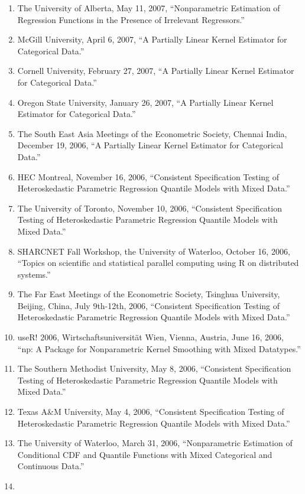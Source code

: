 \documentclass[
]{article}
\begin{document}
\begin{enumerate}
  Quantitative Data.''
\item
  The University of Alberta, May 11, 2007, ``Nonparametric Estimation of
  Regression Functions in the Presence of Irrelevant Regressors.''
\item
  McGill University, April 6, 2007, ``A Partially Linear Kernel
  Estimator for Categorical Data.''
\item
  Cornell University, February 27, 2007, ``A Partially Linear Kernel
  Estimator for Categorical Data.''
\item
  Oregon State University, January 26, 2007, ``A Partially Linear Kernel
  Estimator for Categorical Data.''
\item
  The South East Asia Meetings of the Econometric Society, Chennai
  India, December 19, 2006, ``A Partially Linear Kernel Estimator for
  Categorical Data.''
\item
  HEC Montreal, November 16, 2006, ``Consistent Specification Testing of
  Heteroskedastic Parametric Regression Quantile Models with Mixed
  Data.''
\item
  The University of Toronto, November 10, 2006, ``Consistent
  Specification Testing of Heteroskedastic Parametric Regression
  Quantile Models with Mixed Data.''
\item
  SHARCNET Fall Workshop, the University of Waterloo, October 16, 2006,
  ``Topics on scientific and statistical parallel computing using R on
  distributed systems.''
\item
  The Far East Meetings of the Econometric Society, Tsinghua University,
  Beijing, China, July 9th-12th, 2006, ``Consistent Specification
  Testing of Heteroskedastic Parametric Regression Quantile Models with
  Mixed Data.''
\item
  useR! 2006, Wirtschaftsuniversität Wien, Vienna, Austria, June 16,
  2006, ``np: A Package for Nonparametric Kernel Smoothing with Mixed
  Datatypes.''
\item
  The Southern Methodist University, May 8, 2006, ``Consistent
  Specification Testing of Heteroskedastic Parametric Regression
  Quantile Models with Mixed Data.''
\item
  Texas A\&M University, May 4, 2006, ``Consistent Specification Testing
  of Heteroskedastic Parametric Regression Quantile Models with Mixed
  Data.''
\item
  The University of Waterloo, March 31, 2006, ``Nonparametric Estimation
  of Conditional CDF and Quantile Functions with Mixed Categorical and
  Continuous Data.''
\item

\end{enumerate}
\end{document}
